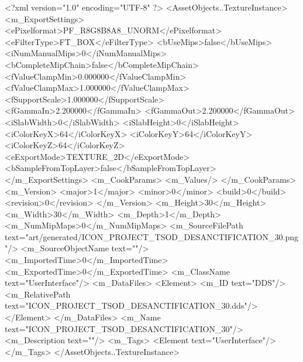 <?xml version="1.0" encoding="UTF-8" ?>
<AssetObjects..TextureInstance>
	<m_ExportSettings>
		<ePixelformat>PF_R8G8B8A8_UNORM</ePixelformat>
		<eFilterType>FT_BOX</eFilterType>
		<bUseMips>false</bUseMips>
		<iNumManualMips>0</iNumManualMips>
		<bCompleteMipChain>false</bCompleteMipChain>
		<fValueClampMin>0.000000</fValueClampMin>
		<fValueClampMax>1.000000</fValueClampMax>
		<fSupportScale>1.000000</fSupportScale>
		<fGammaIn>2.200000</fGammaIn>
		<fGammaOut>2.200000</fGammaOut>
		<iSlabWidth>0</iSlabWidth>
		<iSlabHeight>0</iSlabHeight>
		<iColorKeyX>64</iColorKeyX>
		<iColorKeyY>64</iColorKeyY>
		<iColorKeyZ>64</iColorKeyZ>
		<eExportMode>TEXTURE_2D</eExportMode>
		<bSampleFromTopLayer>false</bSampleFromTopLayer>
	</m_ExportSettings>
	<m_CookParams>
		<m_Values/>
	</m_CookParams>
	<m_Version>
		<major>1</major>
		<minor>0</minor>
		<build>0</build>
		<revision>0</revision>
	</m_Version>
	<m_Height>30</m_Height>
	<m_Width>30</m_Width>
	<m_Depth>1</m_Depth>
	<m_NumMipMaps>0</m_NumMipMaps>
	<m_SourceFilePath text="art/generated/ICON_PROJECT_TSOD_DESANCTIFICATION_30.png"/>
	<m_SourceObjectName text=""/>
	<m_ImportedTime>0</m_ImportedTime>
	<m_ExportedTime>0</m_ExportedTime>
	<m_ClassName text="UserInterface"/>
	<m_DataFiles>
		<Element>
			<m_ID text="DDS"/>
			<m_RelativePath text="ICON_PROJECT_TSOD_DESANCTIFICATION_30.dds"/>
		</Element>
	</m_DataFiles>
	<m_Name text="ICON_PROJECT_TSOD_DESANCTIFICATION_30"/>
	<m_Description text=""/>
	<m_Tags>
		<Element text="UserInterface"/>
	</m_Tags>
</AssetObjects..TextureInstance>
